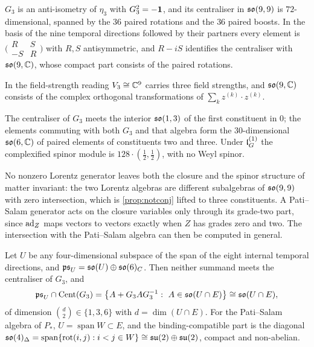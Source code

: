 \begin{theorem}
\label{thm:so9C}
$G_3$ is an anti-isometry of $\eta_3$ with $G_3^2=-\mathbf 1$, and its centraliser in $\mathfrak{so}(9,9)$ is $72$-dimensional, spanned by the $36$ paired rotations
and the $36$ paired boosts. In the basis of the nine temporal directions followed by their partners every element is
$\bigl(\begin{smallmatrix}R&S\\-S&R\end{smallmatrix}\bigr)$ with $R,S$ antisymmetric, and $R-iS$ identifies the centraliser with $\mathfrak{so}(9,\mathbb{C})$, whose
compact part consists of the paired rotations.
\end{theorem}

In the field-strength reading $V_3\cong\mathbb{C}^9$ carries three field strengths, and $\mathfrak{so}(9,\mathbb{C})$ consists of the complex orthogonal transformations of
$\sum_kz^{(k)}\cdot z^{(k)}$.

\begin{theorem}
\label{thm:nocommon}
The centraliser of $G_3$ meets the interior $\mathfrak{so}(1,3)$ of the first constituent in $0$; the elements commuting with both $G_3$ and that algebra form
the $30$-dimensional $\mathfrak{so}(6,\mathbb{C})$ of paired elements of constituents two and three. Under $\mathfrak l_G^{(1)}$ the complexified spinor module is
$128\cdot(\tfrac12,\tfrac12)$, with no Weyl spinor.
\end{theorem}

No nonzero Lorentz generator leaves both the closure and the spinor structure of matter invariant: the two Lorentz algebras are different
subalgebras of $\mathfrak{so}(9,9)$ with zero intersection, which is \cref{prop:notconj} lifted to three constituents. A Pati--Salam generator acts on the
closure variables only through its grade-two part, since $\operatorname{ad}_Z$ maps vectors to vectors exactly when $Z$ has grades zero and two. The intersection
with the Pati--Salam algebra can then be computed in general.

\begin{theorem}
\label{thm:PSbinding}
Let $U$ be any four-dimensional subspace of the span of the eight internal temporal directions, and $\mathfrak{ps}_U=\mathfrak{so}(U)\oplus\mathfrak{so}(6)_C$. Then neither
summand meets the centraliser of $G_3$, and
\[
\mathfrak{ps}_U\cap\Cent(G_3)=\bigl\{A+G_3AG_3^{-1}:\ A\in\so{U\cap E}\bigr\}\cong\so{U\cap E},
\]
of dimension $\binom d2\in\{1,3,6\}$ with $d=\dim(U\cap E)$. For the Pati--Salam algebra of $P_*$, $U=\operatorname{span}W\subset E$, and the
binding-compatible part is the diagonal $\mathfrak{so}(4)_\Delta=\operatorname{span}\{\mathrm{rot}(i,j):i<j\in W\}\cong\mathfrak{su}(2)\oplus\mathfrak{su}(2)$, compact and non-abelian.
\end{theorem}

